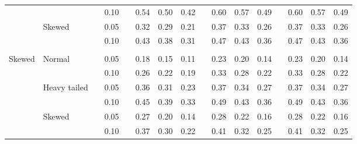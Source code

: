 \documentclass{article} %
\begin{document}
\begin{table}[ht]
\begin{scriptsize}
\begin{center}
\begin{tabular}{ll p{.1cm} c p{.1cm} rrr p{.1cm} rrr p{.1cm} rrr}
             &              && 0.10 &&   0.54 & 0.50 & 0.42 && 0.60 & 0.57 & 0.49 && 0.60 & 0.57 & 0.49 \\ 
             & Skewed       && 0.05 &&   0.32 & 0.29 & 0.21 && 0.37 & 0.33 & 0.26 && 0.37 & 0.33 & 0.26 \\ 
             &              && 0.10 &&   0.43 & 0.38 & 0.31 && 0.47 & 0.43 & 0.36 && 0.47 & 0.43 & 0.36 \\ 
             &&&&&&&&&&&&&&&\\
Skewed       & Normal       && 0.05 &&   0.18 & 0.15 & 0.11 && 0.23 & 0.20 & 0.14 && 0.23 & 0.20 & 0.14 \\ 
             &              && 0.10 &&   0.26 & 0.22 & 0.19 && 0.33 & 0.28 & 0.22 && 0.33 & 0.28 & 0.22 \\ 
             & Heavy tailed && 0.05 &&   0.36 & 0.31 & 0.23 && 0.37 & 0.34 & 0.27 && 0.37 & 0.34 & 0.27 \\ 
             &              && 0.10 &&   0.45 & 0.39 & 0.33 && 0.49 & 0.43 & 0.36 && 0.49 & 0.43 & 0.36 \\ 
             & Skewed       && 0.05 &&   0.27 & 0.20 & 0.14 && 0.28 & 0.22 & 0.16 && 0.28 & 0.22 & 0.16 \\ 
             &              && 0.10 &&   0.37 & 0.30 & 0.22 && 0.41 & 0.32 & 0.25 && 0.41 & 0.32 & 0.25 \\ 




\end{tabular}
\end{center}
\end{scriptsize}
\end{table}
\end{document}
